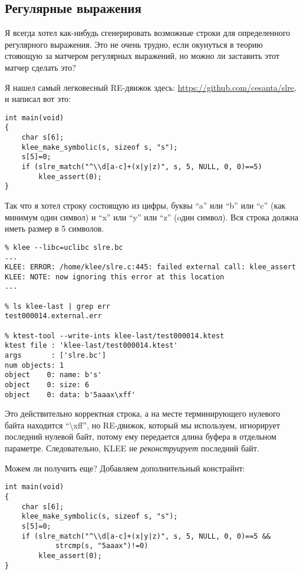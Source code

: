 \subsection{Регулярные выражения}

Я всегда хотел как-нибудь сгенерировать возможные строки для определенного регулярного выражения.
Это не очень трудно, если окунуться в теорию стояющую за матчером регулярных выражений, но можно ли заставить
этот матчер сделать это?

Я нашел самый легковесный RE-движок здесь: \url{https://github.com/cesanta/slre}, и написал вот это:

\begin{lstlisting}
int main(void)
{
	char s[6];
	klee_make_symbolic(s, sizeof s, "s");
	s[5]=0;
	if (slre_match("^\\d[a-c]+(x|y|z)", s, 5, NULL, 0, 0)==5)
		klee_assert(0);
}
\end{lstlisting}

Так что я хотел строку состоящую из цифры, буквы ``a'' или ``b'' или ``c'' (как минимум один символ) и ``x'' или ``y'' или ``z'' (oдин символ).
Вся строка должна иметь размер в 5 символов.

\begin{lstlisting}
% klee --libc=uclibc slre.bc
...
KLEE: ERROR: /home/klee/slre.c:445: failed external call: klee_assert
KLEE: NOTE: now ignoring this error at this location
...

% ls klee-last | grep err
test000014.external.err

% ktest-tool --write-ints klee-last/test000014.ktest
ktest file : 'klee-last/test000014.ktest'
args       : ['slre.bc']
num objects: 1
object    0: name: b's'
object    0: size: 6
object    0: data: b'5aaax\xff'
\end{lstlisting}

Это действительно корректная строка, а на месте терминирующего нулевого байта находится ``\textbackslash{}xff'',
но RE-движок, который мы используем, игнорирует последний нулевой байт, потому ему передается длина буфера в отдельном параметре.
Следовательно, KLEE не \textit{реконструирует} последний байт.

Можем ли получить еще?
Добавляем дополнительный констрайнт:

\begin{lstlisting}
int main(void)
{
	char s[6];
	klee_make_symbolic(s, sizeof s, "s");
	s[5]=0;
	if (slre_match("^\\d[a-c]+(x|y|z)", s, 5, NULL, 0, 0)==5 &&
			strcmp(s, "5aaax")!=0)
		klee_assert(0);
}
\end{lstlisting}

